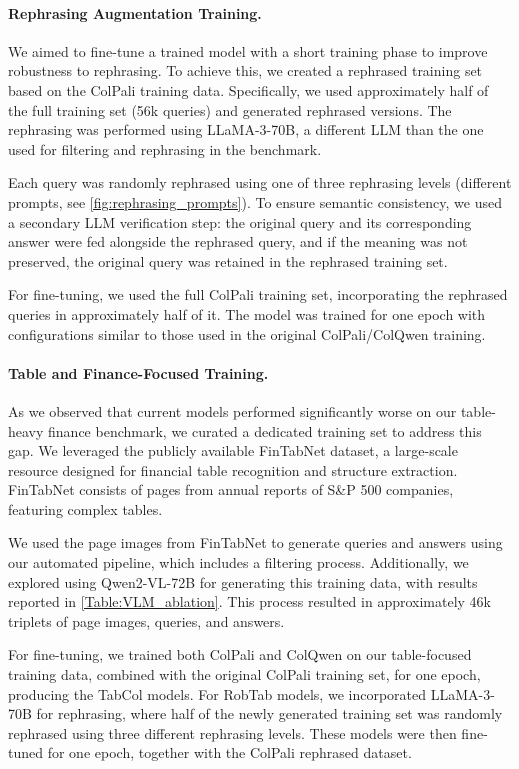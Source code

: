 \paragraph{Rephrasing Augmentation Training.}
We aimed to fine-tune a trained model with a short training phase to improve robustness to rephrasing. To achieve this, we created a rephrased training set based on the ColPali training data. Specifically, we used approximately half of the full training set (56k queries) and generated rephrased versions. The rephrasing was performed using LLaMA-3-70B, a different LLM than the one used for filtering and rephrasing in the benchmark.

Each query was randomly rephrased using one of three rephrasing levels (different prompts, see \cref{fig:rephrasing_prompts}). To ensure semantic consistency, we used a secondary LLM verification step: the original query and its corresponding answer were fed alongside the rephrased query, and if the meaning was not preserved, the original query was retained in the rephrased training set.

For fine-tuning, we used the full ColPali training set, incorporating the rephrased queries in approximately half of it. The model was trained for one epoch with configurations similar to those used in the original ColPali/ColQwen training.

\paragraph{Table and Finance-Focused Training.}
As we observed that current models performed significantly worse on our table-heavy finance benchmark, we curated a dedicated training set to address this gap. We leveraged the publicly available FinTabNet dataset, a large-scale resource designed for financial table recognition and structure extraction. FinTabNet consists of pages from annual reports of S\&P 500 companies, featuring complex tables.

We used the page images from FinTabNet to generate queries and answers using our automated pipeline, which includes a filtering process. Additionally, we explored using Qwen2-VL-72B for generating this training data, with results reported in \cref{Table:VLM_ablation}. This process resulted in approximately 46k triplets of page images, queries, and answers.

For fine-tuning, we trained both ColPali and ColQwen on our table-focused training data, combined with the original ColPali training set, for one epoch, producing the TabCol models. For RobTab models, we incorporated LLaMA-3-70B for rephrasing, where half of the newly generated training set was randomly rephrased using three different rephrasing levels. These models were then fine-tuned for one epoch, together with the ColPali rephrased dataset.

